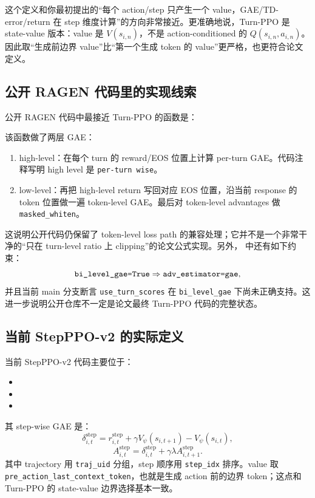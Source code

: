\documentclass[10pt]{ctexart}
\newcommand{\code}[1]{\texttt{#1}}
\begin{document}
这个定义和你最初提出的“每个 action/step 只产生一个 value，GAE/TD-error/return 在 step 维度计算”的方向非常接近。更准确地说，Turn-PPO 是 state-value 版本：value 是 $V(s_{i,n})$，不是 action-conditioned 的 $Q(s_{i,n},a_{i,n})$。因此取“生成前边界 value”比“第一个生成 token 的 value”更严格，也更符合论文定义。

\subsection*{公开 RAGEN 代码里的实现线索}
公开 RAGEN 代码中最接近 Turn-PPO 的函数是：
\begin{center}
\end{center}
该函数做了两层 GAE：
\begin{enumerate}
  \item high-level：在每个 turn 的 reward/EOS 位置上计算 per-turn GAE。代码注释写明 high level 是 \code{per-turn wise}。
  \item low-level：再把 high-level return 写回对应 EOS 位置，沿当前 response 的 token 位置做一遍 token-level GAE。最后对 token-level advantages 做 \code{masked\_whiten}。
\end{enumerate}

这说明公开代码仍保留了 token-level loss path 的兼容处理；它并不是一个非常干净的“只在 turn-level ratio 上 clipping”的论文公式实现。另外， 中还有如下约束：
\[
\text{\texttt{bi\_level\_gae=True}} \Rightarrow \text{\texttt{adv\_estimator=gae}},
\]
并且当前 main 分支断言 \code{use\_turn\_scores} 在 \code{bi\_level\_gae} 下尚未正确支持。这进一步说明公开仓库不一定是论文最终 Turn-PPO 代码的完整状态。

\subsection*{当前 StepPPO-v2 的实际定义}
当前 StepPPO-v2 代码主要位于：
\begin{itemize}
  \item {}
  \item {}
  \item {}
\end{itemize}

其 step-wise GAE 是：
\[
\delta^{\mathrm{step}}_{i,t}
= r^{\mathrm{step}}_{i,t}+\gamma V_{\psi}(s_{i,t+1})-V_{\psi}(s_{i,t}),
\]
\[
A^{\mathrm{step}}_{i,t}
=\delta^{\mathrm{step}}_{i,t}+\gamma\lambda A^{\mathrm{step}}_{i,t+1}.
\]
其中 trajectory 用 \code{traj\_uid} 分组，step 顺序用 \code{step\_idx} 排序。value 取 \code{pre\_action\_last\_context\_token}，也就是生成 action 前的边界 token；这点和 Turn-PPO 的 state-value 边界选择基本一致。
\end{document}
